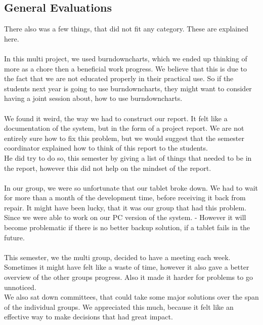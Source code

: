 \subsection{General Evaluations}
There also was a few things, that did not fit any category. These are explained here.\\
\\
In this multi project, we used burndowncharts, which we ended up thinking of more as a chore then a beneficial work progress. We believe that this is due to the fact that we are not educated properly in their practical use. So if the students next year is going to use burndowncharts, they might want to consider having a joint session about, how to use burndowncharts.\\
\\
We found it weird, the way we had to construct our report. It felt like a documentation of the system, but in the form of a project report. We are not entirely sure how to fix this problem, but we would suggest that the semester coordinator explained how to think of this report to the students.\\
He did try to do so, this semester by giving a list of things that needed to be in the report, however this did not help on the mindset of the report.\\
\\
In our group, we were so unfortunate that our tablet broke down. We had to wait for more than a month of the development time, before receiving it back from repair. It might have been lucky, that it was our group that had this problem. Since we were able to work on our PC version of the system. - However it will become problematic if there is no better backup solution, if a tablet fails in the future.\\
\\
This semester, we the multi group, decided to have a meeting each week. Sometimes it might have felt like a waste of time, however it also gave a better overview of the other groups progress. Also it made it harder for problems to go unnoticed.\\
We also sat down committees, that could take some major solutions over the span of the individual groups. We appreciated this much, because it felt like an effective way to make decisions that had great impact.


